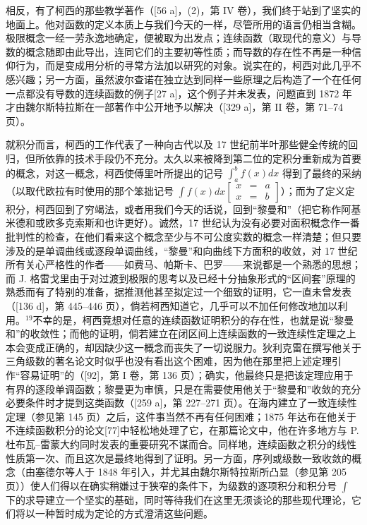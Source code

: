 相反，有了柯西的那些教学著作（{[}56 a{]}，(2)，第 IV 卷），我们终于站到了坚实的地面上。他对函数的定义本质上与我们今天的一样，尽管所用的语言仍相当含糊。极限概念一经一劳永逸地确定，便被取为出发点；连续函数（取现代的意义）与导数的概念随即由此导出，连同它们的主要初等性质；而导数的存在性不再是一种信仰行为，而是变成用分析的寻常方法加以研究的对象。说实在的，柯西对此几乎不感兴趣；另一方面，虽然波尔查诺在独立达到同样一些原理之后构造了一个在任何一点都没有导数的连续函数的例子{[}27 a{]}，这个例子并未发表，问题直到 1872 年才由魏尔斯特拉斯在一部著作中公开地予以解决（{[}329 a{]}，第 II 卷，第 71–74 页）。

就积分而言，柯西的工作代表了一种向古代以及 17 世纪前半叶那些健全传统的回归，但所依靠的技术手段仍不充分。太久以来被降到第二位的定积分重新成为首要的概念，对这一概念，柯西使傅里叶所提出的记号 \(\int_{a}^{b} f(x) dx\) 得到了最终的采纳（以取代欧拉有时使用的那个笨拙记号 \(\int f(x) dx\left[\begin{array}{ccc}x & = & a \\ x & = & b\end{array}\right]\)）；而为了定义定积分，柯西回到了穷竭法，或者用我们今天的话说，回到“黎曼和”（把它称作阿基米德和或欧多克索斯和也许更好）。诚然，17 世纪认为没有必要对面积概念作一番批判性的检查，在他们看来这个概念至少与不可公度实数的概念一样清楚；但只要涉及的是单调曲线或逐段单调曲线，“黎曼”和向曲线下方面积的收敛，对 17 世纪所有关心严格性的作者——如费马、帕斯卡、巴罗——来说都是一个熟悉的思想；而 J. 格雷戈里由于对过渡到极限的思考以及已经十分抽象形式的“区间套”原理的熟悉而有了特别的准备，据推测他甚至拟定过一个细致的证明，它一直未曾发表（{[}136 d{]}，第 445–446 页），倘若柯西知道它，几乎可以不加任何修改地加以利用。\(^{19}\)不幸的是，柯西竟想对任意的连续函数证明积分的存在性，也就是说“黎曼和”的收敛性；而他的证明，倘若建立在闭区间上连续函数的一致连续性定理之上本会变成正确的，却因缺少这一概念而丧失了一切说服力。狄利克雷在撰写他关于三角级数的著名论文时似乎也没有看出这个困难，因为他在那里把上述定理引作“容易证明”的（{[}92{]}，第 I 卷，第 136 页）；确实，他最终只是把该定理应用于有界的逐段单调函数；黎曼更为审慎，只是在需要使用他关于“黎曼和”收敛的充分必要条件时才提到这类函数（{[}259 a{]}，第 227–271 页）。在海内建立了一致连续性定理（参见第 145 页）之后，这件事当然不再有任何困难；1875 年达布在他关于不连续函数积分的论文{[}77{]}中轻松地处理了它，在那篇论文中，他在许多地方与 P. 杜布瓦–雷蒙大约同时发表的重要研究不谋而合。同样地，连续函数之积分的线性性质第一次、而且这次是最终地得到了证明。另一方面，序列或级数一致收敛的概念（由塞德尔等人于 1848 年引入，并尤其由魏尔斯特拉斯所凸显（参见第 205 页））使人们得以在确实稍嫌过于狭窄的条件下，为级数的逐项积分和积分号 \(\int\) 下的求导建立一个坚实的基础，同时等待我们在这里无须谈论的那些现代理论，它们将以一种暂时成为定论的方式澄清这些问题。

